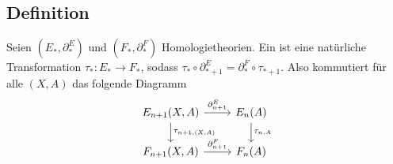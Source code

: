 \subsection[Definition: Morphismus von Homologietheorien]{Definition} %
\label{sub:148}
Seien $(E_*,\partial_*^E)$ und $(F_*,\partial_*^F)$ Homologietheorien. Ein  ist eine natürliche Transformation
$\tau_* \colon E_* \to F_*$, sodass $\tau_* \circ \partial_{*+1}^E = \partial_*^F \circ \tau_{*+1}$. Also kommutiert für alle $(X,A)$ das folgende Diagramm
\[
	\begin{tikzcd}
		E_{n+1}(X,A) \rar["\partial_{n+1}^E"] \dar["\tau_{n+1,(X,A)}"] & E_n(A) \dar["\tau_{n,A}"] \\
		F_{n+1}(X,A) \rar["\partial_{n+1}^F"] & F_n(A)
	\end{tikzcd}
\]

